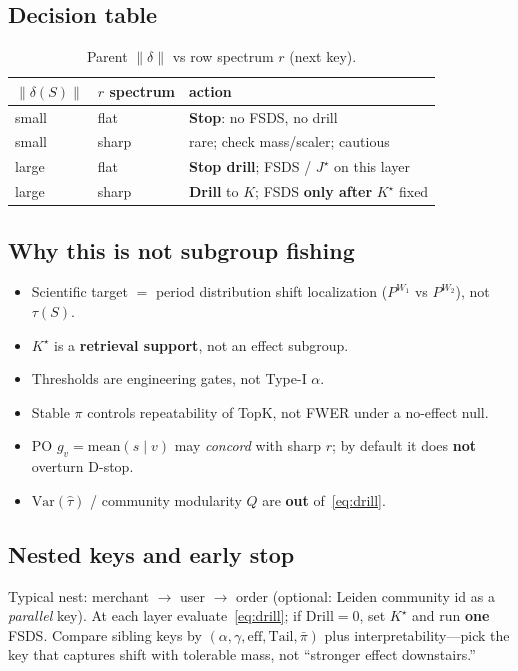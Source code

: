 \documentclass[11pt]{article}
\newcommand{\Drill}{\mathrm{Drill}}
\newcommand{\Tail}{\mathrm{Tail}}
\begin{document}
\subsection{Decision table}
\begin{table}[h]
\centering
\caption{Parent $\|\delta\|$ vs row spectrum $r$ (next key).}
\label{tab:decision}
\begin{tabular}{lll}
\toprule
$\|\delta(S)\|$ & $r$ spectrum & action \\
\midrule
small & flat & \textbf{Stop}: no FSDS, no drill \\
small & sharp & rare; check mass/scaler; cautious \\
large & flat & \textbf{Stop drill}; FSDS / $J^\star$ on this layer \\
large & sharp & \textbf{Drill} to $K$; FSDS \textbf{only after} $K^\star$ fixed \\
\bottomrule
\end{tabular}
\end{table}

\subsection{Why this is not subgroup fishing}
\begin{itemize}[leftmargin=*,itemsep=0.3em]
  \item Scientific target $=$ period distribution shift localization
        ($P^{W_1}$ vs $P^{W_2}$), not $\tau(S)$.
  \item $K^\star$ is a \textbf{retrieval support}, not an effect subgroup.
  \item Thresholds are engineering gates, not Type-I $\alpha$.
  \item Stable $\pi$ controls repeatability of TopK, not FWER under a
        no-effect null.
  \item PO $g_v=\mathrm{mean}(s\mid v)$ may \emph{concord} with sharp $r$;
        by default it does \textbf{not} overturn D-stop.
  \item $\mathrm{Var}(\hat\tau)$ / community modularity $Q$ are
        \textbf{out} of~\eqref{eq:drill}.
\end{itemize}

\subsection{Nested keys and early stop}
Typical nest: merchant $\to$ user $\to$ order (optional: Leiden
community id as a \emph{parallel} key).
At each layer evaluate~\eqref{eq:drill}; if $\Drill=0$, set
$K^\star$ and run \textbf{one} FSDS.
Compare sibling keys by $(\alpha,\gamma,\mathrm{eff},\Tail,\bar\pi)$
plus interpretability---pick the key that captures shift with
tolerable mass, not ``stronger effect downstairs.''
\end{document}
